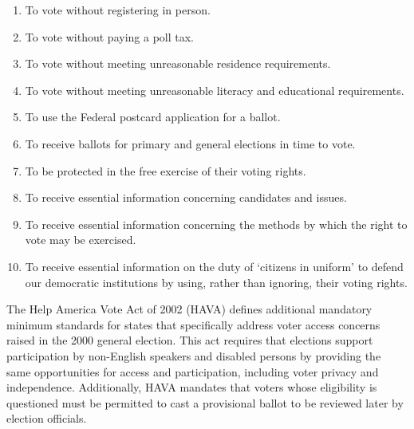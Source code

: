 \begin{enumerate}
  \item To vote without registering in person.
  \item To vote without paying a poll tax.
  \item To vote without meeting unreasonable residence requirements.
  \item To vote without meeting unreasonable literacy and educational
    requirements.
  \item To use the Federal postcard application for a ballot.
  \item To receive ballots for primary and general elections in time to vote.
  \item To be protected in the free exercise of their voting rights.
  \item To receive essential information concerning candidates and issues.
  \item To receive essential information concerning the methods by which the
    right to vote may be exercised.
  \item To receive essential information on the duty of `citizens in uniform'
    to defend our democratic institutions by using, rather than ignoring, their
    voting rights.
\end{enumerate}


The Help America Vote Act of 2002 (HAVA) defines additional mandatory
minimum standards for states that specifically address voter access
concerns raised in the 2000 general election. This act requires that
elections support participation by non-English speakers and disabled
persons by providing the same opportunities for access and
participation, including voter privacy and independence. Additionally,
HAVA mandates that voters whose eligibility is questioned must be
permitted to cast a provisional ballot to be reviewed later by
election officials.




